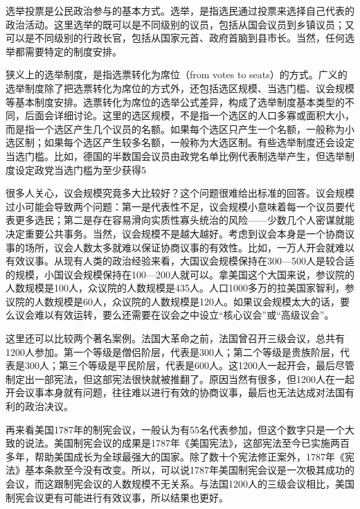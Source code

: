 
选举投票是公民政治参与的基本方式。选举，是指选民通过投票来选择自己代表的政治活动。这里选举的既可以是不同级别的议员，包括从国会议员到乡镇议员；又可以是不同级别的行政长官，包括从国家元首、政府首脑到县市长。当然，任何选举都需要特定的制度安排。

狭义上的选举制度，是指选票转化为席位（from votes to seats）的方式。广义的选举制度除了把选票转化为席位的方式外，还包括选区规模、当选门槛、议会规模等基本制度安排。选票转化为席位的选举公式差异，构成了选举制度基本类型的不同，后面会详细讨论。这里的选区规模，不是指一个选区的人口多寡或面积大小，而是指一个选区产生几个议员的名额。如果每个选区只产生一个名额，一般称为小选区制；如果每个选区产生较多名额，一般称为大选区制。有些选举制度还会设定当选门槛。比如，德国的半数国会议员由政党名单比例代表制选举产生，但选举制度设定政党当选门槛为至少获得5%

很多人关心，议会规模究竟多大比较好？这个问题很难给出标准的回答。议会规模过小可能会导致两个问题：第一是代表性不足，议会规模小意味着每一个议员要代表更多选民；第二是存在容易滑向实质性寡头统治的风险——少数几个人密谋就能决定重要公共事务。当然，议会规模不是越大越好。考虑到议会本身是一个协商议事的场所，议会人数太多就难以保证协商议事的有效性。比如，一万人开会就难以有效议事。从现有人类的政治经验来看，大国议会规模保持在300—500人是较合适的规模，小国议会规模保持在100—200人就可以。拿美国这个大国来说，参议院的人数规模是100人，众议院的人数规模是435人。人口1000多万的拉美国家智利，参议院的人数规模是60人，众议院的人数规模是120人。如果议会规模太大的话，要么议会难以有效运转，要么还需要在议会之中设立“核心议会”或“高级议会”。

这里还可以比较两个著名案例。法国大革命之前，法国曾召开三级会议，总共有1200人参加。第一个等级是僧侣阶层，代表是300人；第二个等级是贵族阶层，代表是300人；第三个等级是平民阶层，代表是600人。这1200人一起开会，最后尽管制定出一部宪法，但这部宪法很快就被推翻了。原因当然有很多，但1200人在一起开会议事本身就有问题，往往难以进行有效的协商议事，最后也无法达成对法国有利的政治决议。

再来看美国1787年的制宪会议，一般认为有55名代表参加，但这个数字只是一个大致的说法。美国制宪会议的成果是1787年《美国宪法》，这部宪法至今已实施两百多年，帮助美国成长为全球最强大的国家。除了数十个宪法修正案外，1787年《宪法》基本条款至今没有改变。所以，可以说1787年美国制宪会议是一次极其成功的会议，而这跟制宪会议的人数规模不无关系。与法国1200人的三级会议相比，美国制宪会议更有可能进行有效议事，所以结果也更好。

